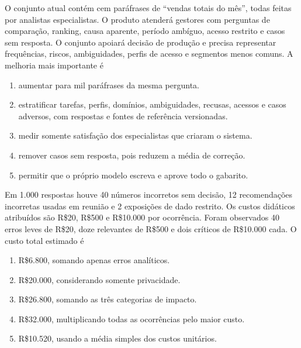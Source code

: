 \TextoBase
O conjunto atual contém cem paráfrases de ``vendas totais do mês'', todas feitas por analistas especialistas. O produto atenderá gestores com perguntas de comparação, ranking, causa aparente, período ambíguo, acesso restrito e casos sem resposta.
O conjunto apoiará decisão de produção e precisa representar frequências, riscos, ambiguidades, perfis de acesso e segmentos menos comuns.
\FonteDidatica
\Comando A melhoria mais importante é
\begin{enumerate}[label=\Alph*)]
\item aumentar para mil paráfrases da mesma pergunta.
\item estratificar tarefas, perfis, domínios, ambiguidades, recusas, acessos e casos adversos, com respostas e fontes de referência versionadas.
\item medir somente satisfação dos especialistas que criaram o sistema.
\item remover casos sem resposta, pois reduzem a média de correção.
\item permitir que o próprio modelo escreva e aprove todo o gabarito.
\end{enumerate}

\TextoBase
Em 1.000 respostas houve 40 números incorretos sem decisão, 12 recomendações incorretas usadas em reunião e 2 exposições de dado restrito. Os custos didáticos atribuídos são R\$20, R\$500 e R\$10.000 por ocorrência.
Foram observados 40 erros leves de R\$20, doze relevantes de R\$500 e dois críticos de R\$10.000 cada.
\FonteDidatica
\Comando O custo total estimado é
\begin{enumerate}[label=\Alph*)]
\item R\$6.800, somando apenas erros analíticos.
\item R\$20.000, considerando somente privacidade.
\item R\$26.800, somando as três categorias de impacto.
\item R\$32.000, multiplicando todas as ocorrências pelo maior custo.
\item R\$10.520, usando a média simples dos custos unitários.
\end{enumerate}

